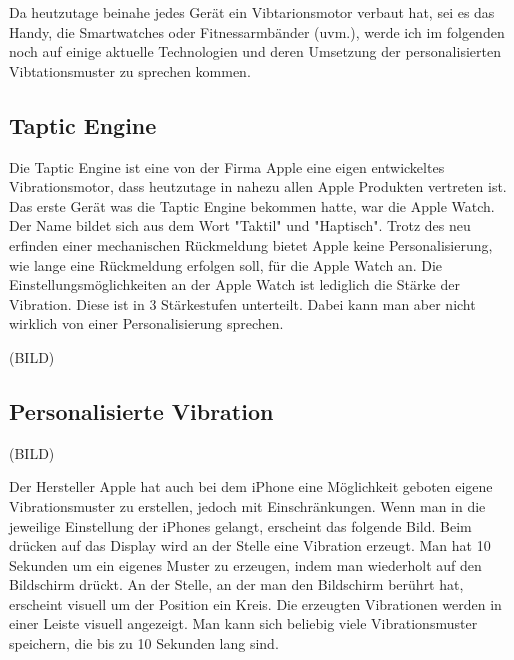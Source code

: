 
Da heutzutage beinahe jedes Ger{\"a}t ein Vibtarionsmotor verbaut hat, sei es das Handy, die Smartwatches oder Fitnessarmb{\"a}nder (uvm.), werde ich im folgenden noch auf einige aktuelle Technologien und deren Umsetzung der personalisierten Vibtationsmuster zu sprechen kommen. 

\subsection{Taptic Engine}
\label{ch:Grundlagen:sec:RelatedWork:subsec:TapticEngine}

Die Taptic Engine ist eine von der Firma Apple eine eigen entwickeltes Vibrationsmotor, dass heutzutage in nahezu allen Apple Produkten vertreten ist. Das erste Ger{\"a}t was die Taptic Engine bekommen hatte, war die Apple Watch. Der Name bildet sich aus dem Wort "Taktil" und "Haptisch". 
Trotz des neu erfinden einer mechanischen R{\"u}ckmeldung bietet Apple keine Personalisierung, wie lange eine R{\"u}ckmeldung erfolgen soll, f{\"u}r die Apple Watch an. Die Einstellungsm{\"o}glichkeiten an der Apple Watch ist lediglich die St{\"a}rke der Vibration. Diese ist in 3 Stärkestufen unterteilt. Dabei kann man aber nicht wirklich von einer Personalisierung sprechen. 

(BILD) 
 
\subsection{Personalisierte Vibration}
\label{ch:Grundlagen:sec:RelatedWork:subsec:PersonalisierteVibration}

(BILD)

Der Hersteller Apple hat auch bei dem iPhone eine M{\"o}glichkeit geboten eigene Vibrationsmuster zu erstellen, jedoch mit Einschr{\"a}nkungen.
Wenn man in die jeweilige Einstellung der iPhones gelangt, erscheint das folgende Bild. Beim dr{\"u}cken auf das Display wird an der Stelle eine Vibration erzeugt. Man hat 10 Sekunden um ein eigenes Muster zu erzeugen, indem man wiederholt auf den Bildschirm dr{\"u}ckt. An der Stelle, an der man den Bildschirm ber{\"u}hrt hat, erscheint visuell um der Position ein Kreis. Die erzeugten Vibrationen werden in einer Leiste visuell angezeigt. 
Man kann sich beliebig viele Vibrationsmuster speichern, die bis zu 10 Sekunden lang sind. \cite{fleizach2016custom}

